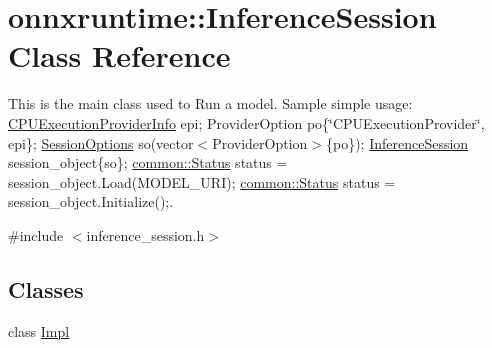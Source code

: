 \hypertarget{classonnxruntime_1_1InferenceSession}{}\section{onnxruntime\+:\+:Inference\+Session Class Reference}
\label{classonnxruntime_1_1InferenceSession}


This is the main class used to Run a model. Sample simple usage\+: \mbox{\hyperlink{structonnxruntime_1_1CPUExecutionProviderInfo}{C\+P\+U\+Execution\+Provider\+Info}} epi; Provider\+Option po\{\char`\"{}\+C\+P\+U\+Execution\+Provider\char`\"{}, epi\}; \mbox{\hyperlink{structonnxruntime_1_1SessionOptions}{Session\+Options}} so(vector$<$\+Provider\+Option$>$\{po\}); \mbox{\hyperlink{classonnxruntime_1_1InferenceSession}{Inference\+Session}} session\+\_\+object\{so\}; \mbox{\hyperlink{classonnxruntime_1_1common_1_1Status}{common\+::\+Status}} status = session\+\_\+object.\+Load(\+M\+O\+D\+E\+L\+\_\+\+U\+R\+I); \mbox{\hyperlink{classonnxruntime_1_1common_1_1Status}{common\+::\+Status}} status = session\+\_\+object.\+Initialize();.  




{\ttfamily \#include $<$inference\+\_\+session.\+h$>$}

\subsection*{Classes}
\begin{DoxyCompactItemize}
\item 
class \mbox{\hyperlink{classonnxruntime_1_1InferenceSession_1_1Impl}{Impl}}
\end{DoxyCompactItemize}

